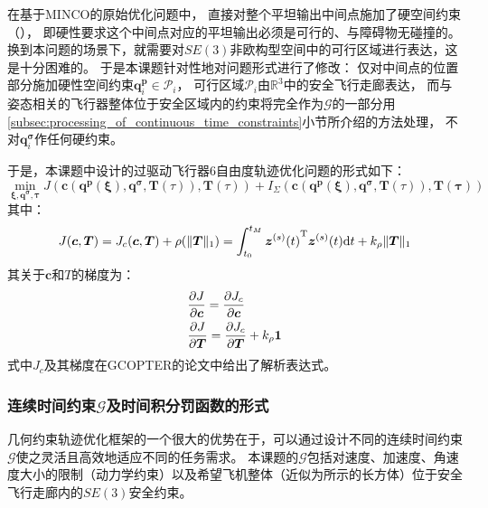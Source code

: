 在基于MINCO的原始优化问题中，
直接对整个平坦输出中间点施加了硬空间约束（），
即硬性要求这个中间点对应的平坦输出必须是可行的、与障碍物无碰撞的。
换到本问题的场景下，就需要对$SE(3)$非欧构型空间中的可行区域进行表达，这是十分困难的。
于是本课题针对性地对问题形式进行了修改：
仅对中间点的位置部分施加硬性空间约束$\bm{q}_i^{\bm{p}} \in \mathcal{P}_i$，
可行区域$\mathcal{P}_i$由$\mathbb{R}^3$中的安全飞行走廊表达，
而与姿态相关的飞行器整体位于安全区域内的约束将完全作为$\mathcal{G}$的一部分用\ref{subsec:processing_of_continuous_time_constraints}小节所介绍的方法处理，
不对$\bm{q}_i^{\bm{\sigma}}$作任何硬约束。

于是，本课题中设计的过驱动飞行器6自由度轨迹优化问题的形式如下：
\begin{equation}
  \min_{\bm{\xi}, \bm{q}^{\bm{\sigma}}, \bm{\tau}}
  J(\bm{c}(\bm{q}^{\bm{p}}(\bm{\xi}), \bm{q}^{\bm{\sigma}}, \bm{T}(\tau)), \bm{T}(\tau)) + 
  I_{\Sigma}(\bm{c}(\bm{q}^{\bm{p}}(\bm{\xi}), \bm{q}^{\bm{\sigma}}, \bm{T}(\tau)), \bm{T}(\bm{\tau}))
  \label{equ:form_of_6dof_trajectory_optimization_problem}
\end{equation}
其中：
\begin{equation}
  J(\bm{c}, \bm{T}) = J_c({\bm{c}, \bm{T}}) + \rho({\Vert \bm{T} \Vert_1}) =
  \int_{t_0}^{t_M} {\bm{z}^{(s)}(t)}^{\text{T}}\bm{z}^{(s)}(t) \mathrm{d}t + 
  k_{\rho}\Vert \bm{T} \Vert_1
  \label{equ:final_form_of_time_regularized_control_effort}
\end{equation}
其关于$\bm{c}$和$T$的梯度为：
\begin{align}
  &\frac{\partial{J}}{\partial{\bm{c}}} = \frac{\partial{J_c}}{\partial{\bm{c}}} \label{equ:grad_J_by_c}\\
  &\frac{\partial{J}}{\partial{\bm{T}}} = \frac{\partial{J_c}}{\partial{\bm{T}}} + k_{\rho}\textbf{1} \label{equ:grad_J_by_T}
\end{align}
式中$J_c$及其梯度在GCOPTER的论文中给出了解析表达式\cite[28]{2021Geometrically}。

\subsubsection{连续时间约束$\mathcal{G}$及时间积分罚函数的形式}\label{subsubsec:form_of_G_and_tipf}
几何约束轨迹优化框架的一个很大的优势在于，可以通过设计不同的连续时间约束$\mathcal{G}$使之灵活且高效地适应不同的任务需求。
本课题的$\mathcal{G}$包括对速度、加速度、角速度大小的限制（动力学约束）以及希望飞机整体（近似为所示的长方体）位于安全飞行走廊内的$SE(3)$安全约束。

